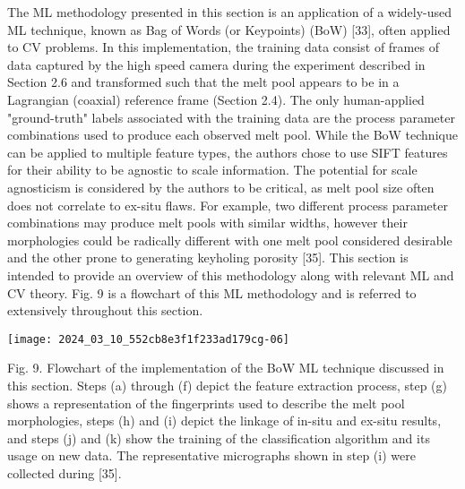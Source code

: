 \documentclass[10pt]{article}
\begin{document}
The ML methodology presented in this section is an application of a widely-used ML technique, known as Bag of Words (or Keypoints) (BoW) [33], often applied to CV problems. In this implementation, the training data consist of frames of data captured by the high speed camera during the experiment described in Section 2.6 and transformed such that the melt pool appears to be in a Lagrangian (coaxial) reference frame (Section 2.4). The only human-applied "ground-truth" labels associated with the training data are the process parameter combinations used to produce each observed melt pool. While the BoW technique can be applied to multiple feature types, the authors chose to use SIFT features for their ability to be agnostic to scale information. The potential for scale agnosticism is considered by the authors to be critical, as melt pool size often does not correlate to ex-situ flaws. For example, two different process parameter combinations may produce melt pools with similar widths, however their morphologies could be radically different with one melt pool considered desirable and the other prone to generating keyholing porosity [35]. This section is intended to provide an overview of this methodology along with relevant ML and CV theory. Fig. 9 is a flowchart of this ML methodology and is referred to extensively throughout this section.

\begin{center}
\texttt{[image: 2024\_03\_10\_552cb8e3f1f233ad179cg-06]}
\end{center}

Fig. 9. Flowchart of the implementation of the BoW ML technique discussed in this section. Steps (a) through (f) depict the feature extraction process, step (g) shows a representation of the fingerprints used to describe the melt pool morphologies, steps (h) and (i) depict the linkage of in-situ and ex-situ results, and steps (j) and (k) show the training of the classification algorithm and its usage on new data. The representative micrographs shown in step (i) were collected during [35].
\end{document}
